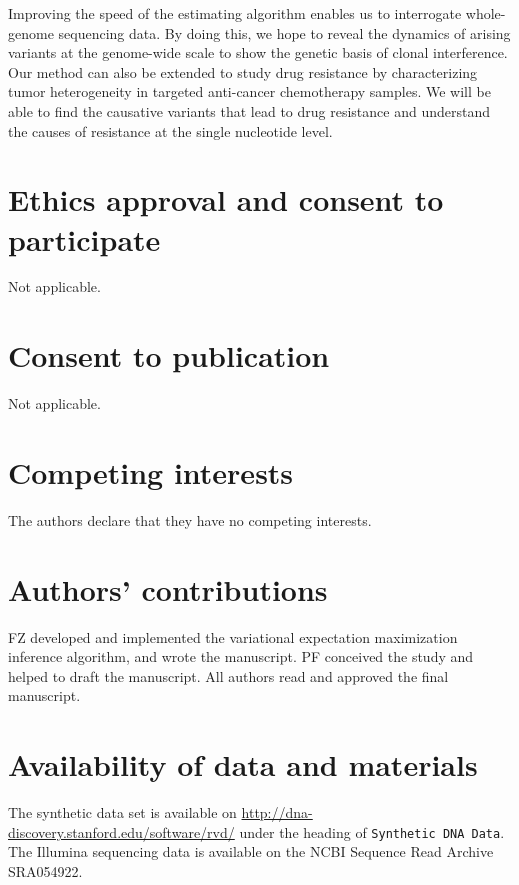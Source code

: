 \documentclass{bmcart}
\begin{document}
Improving the speed of the estimating algorithm enables us to interrogate whole-genome sequencing data.
By doing this, we hope to reveal the dynamics of arising variants at the genome-wide scale to show the genetic basis of clonal interference.
Our method can also be extended to study drug resistance by characterizing tumor heterogeneity in targeted anti-cancer chemotherapy samples.
We will be able to find the causative variants that lead to drug resistance and understand the causes of resistance at the single nucleotide level.



\begin{backmatter}

\section*{Ethics approval and consent to participate}
Not applicable.

\section*{Consent to publication}
Not applicable.

\section*{Competing interests}
  The authors declare that they have no competing interests.

\section*{Authors' contributions}
FZ developed and implemented the variational expectation maximization inference algorithm, and wrote the manuscript.
PF conceived the study and helped to draft the manuscript.
All authors read and approved the final manuscript.

\section*{Availability of data and materials}
The synthetic data set is available on \url{http://dna-discovery.stanford.edu/software/rvd/} under the heading of \texttt{Synthetic DNA Data}. 
The Illumina sequencing data is available on the NCBI Sequence Read Archive SRA054922.


\end{backmatter}
\end{document}
